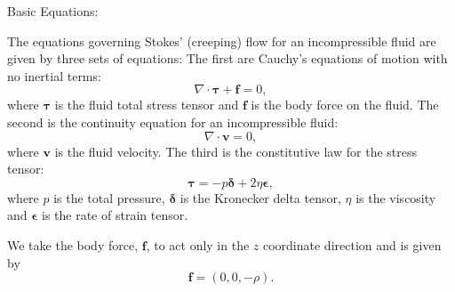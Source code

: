   {\large \fontB Basic Equations:}

  The equations governing Stokes' (creeping) flow for an incompressible fluid are given by three sets of equations:
  The first are Cauchy's equations of motion with no inertial terms:
  \begin{equation}
    \nabla\cdot{\bm \tau} + {\bm f} =0,
  \end{equation}
  where ${\bm \tau}$ is the fluid total stress tensor and ${\bm f}$ is the body force on the fluid.
  The second is the continuity equation for an incompressible fluid:
  \begin{equation}
    \nabla\cdot{\bm v} = 0,
  \end{equation}
  where ${\bm v}$ is the fluid velocity. The third is the constitutive law for the stress tensor:
  \begin{equation}
    {\bm \tau} = -p{\bm \delta} + 2\eta{\bm \epsilon},
  \end{equation}
  where $p$ is the total pressure, ${\bm \delta}$ is the Kronecker delta tensor, $\eta$ is the viscosity and
  ${\bm \epsilon}$ is the rate of strain tensor.
  
  We take the body force, ${\bm f}$, to act only in the $z$ coordinate direction and is given by
  \begin{equation}
    {\bm f} = (0,0,-\rho).
  \end{equation}

